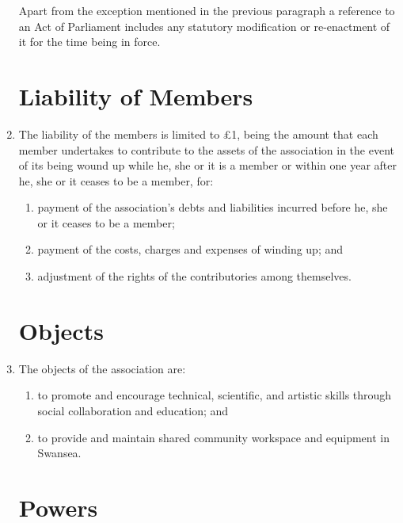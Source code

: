\begin{enumerate}
  Apart from the exception mentioned in the previous paragraph a
  reference to an Act of Parliament includes any statutory
  modification or re-enactment of it for the time being in force.

\section{Liability of Members}

\item
  The liability of the members is limited to £1, being the amount that
  each member undertakes to contribute to the assets of the association
  in the event of its being wound up while he, she or it is a member or
  within one year after he, she or it ceases to be a member, for:
  \begin{enumerate}
  \item
    payment of the association's debts and liabilities incurred before he,
    she or it ceases to be a member;
  \item
    payment of the costs, charges and expenses of winding up; and
  \item
    adjustment of the rights of the contributories among themselves.
  \end{enumerate}

\section{Objects}

\item
  The objects of the association are:
  \begin{enumerate}
  \item
    to promote and encourage technical, scientific, and artistic skills through social collaboration and education; and
  \item
    to provide and maintain shared community workspace and equipment in Swansea.
  \end{enumerate}

\section{Powers}


\end{enumerate}

